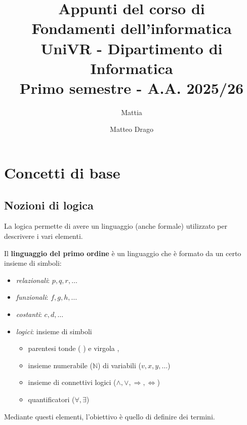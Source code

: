 \documentclass[12pt, a4paper, oneside]{book}
\title{\Huge\bfseries Appunti del corso di \\[0.5ex]
\textcolor{azzurrino}{Fondamenti dell'informatica} \\[1ex]
\Large UniVR - Dipartimento di Informatica \\[1.5ex]
\Large Primo semestre - A.A. 2025/26}
\author{\Large Mattia \and Matteo Drago}
\date{}
\begin{document}
    \frontmatter
    \maketitle
    \tableofcontents
    \thispagestyle{empty}
    \newpage

    \mainmatter

    \chapter{Concetti di base}

    \section{Nozioni di logica}
    La logica permette di avere un linguaggio (anche formale) utilizzato per descrivere i vari elementi.

    Il \textbf{linguaggio del primo ordine} è un linguaggio che è formato da un certo insieme di simboli:
    \begin{itemize}
      \item \textit{relazionali}: $p, q, r, \dots$
      \item \textit{funzionali}: $f, g, h, \dots$
      \item \textit{costanti}: $c, d, \dots$
      \item \textit{logici}: insieme di simboli
      \begin{itemize}
        \item parentesi tonde ( ) e virgola ,
        \item insieme numerabile ($\mathbb{N}$) di variabili ($v, x, y, \dots$) 
        \item insieme di connettivi logici ($\land, \lor, \Rightarrow, \Leftrightarrow$)
        \item quantificatori ($\forall, \exists$)
      \end{itemize}
    \end{itemize}

    Mediante questi elementi, l'obiettivo è quello di definire dei termini.

\end{document}
